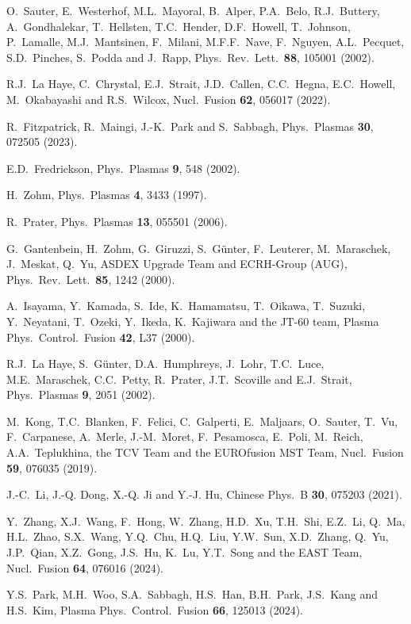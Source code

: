 \documentclass[12pt,prb,aps]{revtex4-1}
\begin{document}
\begin{thebibliography}{99}
 O.~Sauter, E.~Westerhof, M.L.~Mayoral, B.~Alper, P.A.~Belo, R.J.~Buttery, A.~Gondhalekar, T.~Hellsten, T.C.~Hender, 
D.F.~Howell, T.~Johnson, P.~Lamalle, M.J.~Mantsinen, F.~Milani, M.F.F.~Nave, F.~Nguyen, A.L.~Pecquet, S.D.~Pinches, S.~Podda and J.~Rapp,
Phys.\ Rev.\ Lett.\ {\bf 88}, 105001 (2002).

 R.J.~La Haye, C.~Chrystal, E.J.~Strait, J.D.~Callen, C.C.~Hegna, E.C.~Howell, M.~Okabayashi and R.S.~Wilcox, Nucl.\ Fusion {\bf 62}, 056017 (2022).

  R.~Fitzpatrick, R.~Maingi, J.-K.~Park and S.~Sabbagh, Phys.\ Plasmas {\bf 30}, 072505 (2023).

 E.D.~Fredrickson, Phys.\ Plasmas {\bf 9}, 548 (2002).

 H.~Zohm, Phys.\ Plasmas {\bf 4}, 3433 (1997). 

 R.~Prater, Phys.\ Plasmas {\bf 13}, 055501 (2006).

 G.~Gantenbein, H.~Zohm, G.~Giruzzi, S.~G\"{u}nter, F.~Leuterer, M.~Maraschek, J.~Meskat, Q.~Yu,  ASDEX Upgrade Team and ECRH-Group (AUG), 
Phys.\ Rev.\ Lett.\ {\bf 85}, 1242 (2000). 

 A.~Isayama, Y.~Kamada, S.~Ide, K.~Hamamatsu, T.~Oikawa, T.~Suzuki, Y.~Neyatani, T.~Ozeki, Y.~Ikeda, K.~Kajiwara and the JT-60 team,  
Plasma Phys.\  Control.\ Fusion {\bf 42}, L37 (2000).

 R.J.~La Haye,  S.~G\"{u}nter,  D.A.~Humphreys,  J.~Lohr,  T.C.~Luce,  M.E.~Maraschek,  C.C.~Petty, R.~Prater,  J.T.~Scoville and E.J.~Strait,
 Phys.\ Plasmas {\bf 9}, 2051 (2002).
 
  M.~Kong, T.C.~Blanken, F.~Felici, C.~Galperti, E.~Maljaars,
O.~Sauter, T.~Vu, F.~Carpanese, A.~Merle, J.-M.~Moret, F.~Pesamosca, E.~Poli, M.~Reich, A.A.~Teplukhina, the TCV Team and the EUROfusion MST Team,
Nucl.\ Fusion {\bf 59}, 076035 (2019).

 J.-C.~Li, J.-Q. Dong, X.-Q. Ji and Y.-J. Hu,  Chinese Phys.\ B {\bf 30}, 075203 (2021).

 Y.~Zhang, X.J.~Wang, F.~Hong, W.~Zhang, H.D.~Xu, T.H.~Shi, E.Z.~Li, Q.~Ma, H.L.~Zhao, S.X.~Wang, Y.Q.~Chu, H.Q.~Liu, Y.W.~Sun, 
X.D.~Zhang, Q.~Yu, J.P.~Qian, X.Z.~Gong, J.S.~Hu, K.~Lu, Y.T.~Song and the EAST Team, 
 Nucl.\ Fusion {\bf 64},  076016 (2024).

 Y.S.~Park, M.H.~Woo, S.A.~Sabbagh, H.S.~Han, B.H.~Park, J.S.~Kang and H.S.~Kim,  Plasma Phys.\ Control.\ Fusion {\bf 66}, 125013 (2024).


\end{thebibliography}
\end{document}
